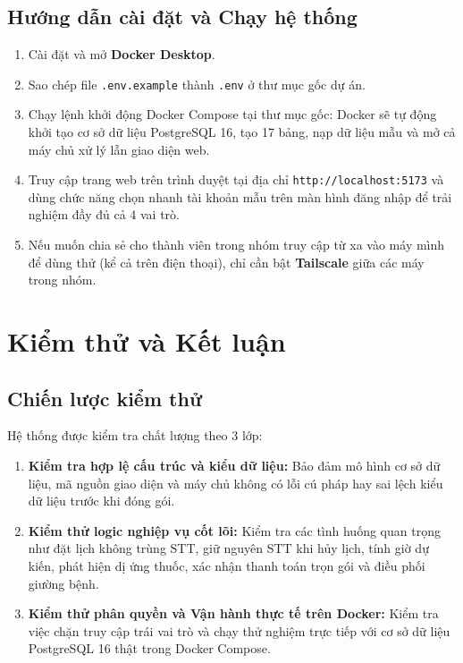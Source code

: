 \documentclass[12pt,a4paper]{report}
\begin{document}
\section{Hướng dẫn cài đặt và Chạy hệ thống}
\begin{enumerate}
  \item Cài đặt và mở \textbf{Docker Desktop}.
  \item Sao chép file \texttt{.env.example} thành \texttt{.env} ở thư mục gốc dự án.
  \item Chạy lệnh khởi động Docker Compose tại thư mục gốc: Docker sẽ tự động khởi tạo cơ sở dữ liệu PostgreSQL 16, tạo 17 bảng, nạp dữ liệu mẫu và mở cả máy chủ xử lý lẫn giao diện web.
  \item Truy cập trang web trên trình duyệt tại địa chỉ \texttt{http://localhost:5173} và dùng chức năng chọn nhanh tài khoản mẫu trên màn hình đăng nhập để trải nghiệm đầy đủ cả 4 vai trò.
  \item Nếu muốn chia sẻ cho thành viên trong nhóm truy cập từ xa vào máy mình để dùng thử (kể cả trên điện thoại), chỉ cần bật \textbf{Tailscale} giữa các máy trong nhóm.
\end{enumerate}

\chapter{Kiểm thử và Kết luận}

\section{Chiến lược kiểm thử}
Hệ thống được kiểm tra chất lượng theo 3 lớp:
\begin{enumerate}
  \item \textbf{Kiểm tra hợp lệ cấu trúc và kiểu dữ liệu:} Bảo đảm mô hình cơ sở dữ liệu, mã nguồn giao diện và máy chủ không có lỗi cú pháp hay sai lệch kiểu dữ liệu trước khi đóng gói.
  \item \textbf{Kiểm thử logic nghiệp vụ cốt lõi:} Kiểm tra các tình huống quan trọng như đặt lịch không trùng STT, giữ nguyên STT khi hủy lịch, tính giờ dự kiến, phát hiện dị ứng thuốc, xác nhận thanh toán trọn gói và điều phối giường bệnh.
  \item \textbf{Kiểm thử phân quyền và Vận hành thực tế trên Docker:} Kiểm tra việc chặn truy cập trái vai trò và chạy thử nghiệm trực tiếp với cơ sở dữ liệu PostgreSQL 16 thật trong Docker Compose.
\end{enumerate}
\end{document}
